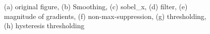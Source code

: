 \documentclass[final]{cvpr}
\begin{document}
\begin{appendices}
\begin{figure}[h]
{  }
  \quad
  \quad
  \quad
  \quad
  \caption{(a) original figure, (b) Smoothing, (c) sobel\_x, (d) filter, (e) magnitude of gradients, (f) non-max-suppression, (g) thresholding, (h) hysteresis thresholding}
  \label{fig:cannyall}
  \end{figure}
  
  


\end{appendices}
\end{document}
